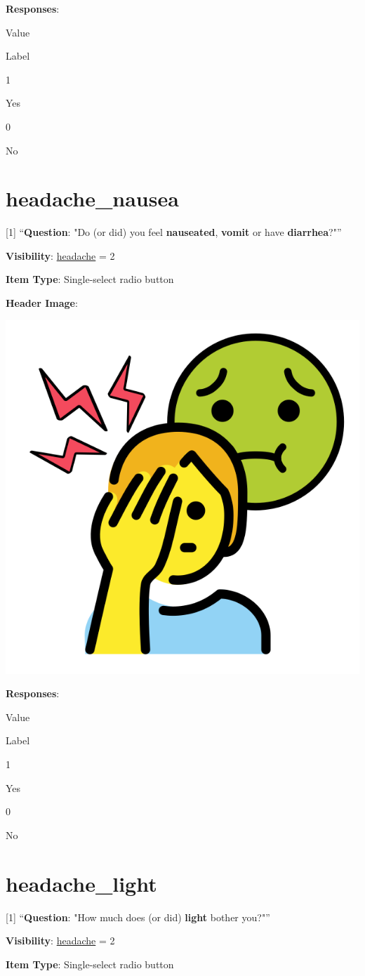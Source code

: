 \documentclass[]{book}
\begin{document}
\textbf{Responses}:

Value

Label

1

Yes

0

No

\hypertarget{headache_nausea}{%
\section{headache\_nausea}\label{headache_nausea}}

{[}1{]} ``\textbf{Question}: "Do (or did) you feel \textbf{nauseated}, \textbf{vomit} or have \textbf{diarrhea}?"''

\textbf{Visibility}: \protect\hyperlink{headache}{headache} = 2

\textbf{Item Type}: Single-select radio button

\textbf{Header Image}:

\begin{flushleft}\includegraphics[width=0.33\linewidth]{downloadFigs4latex_NIMH_Applet_Codebook/headache_nausea_headerImg} \end{flushleft}

\textbf{Responses}:

Value

Label

1

Yes

0

No

\hypertarget{headache_light}{%
\section{headache\_light}\label{headache_light}}

{[}1{]} ``\textbf{Question}: "How much does (or did) \textbf{light} bother you?"''

\textbf{Visibility}: \protect\hyperlink{headache}{headache} = 2

\textbf{Item Type}: Single-select radio button
\end{document}
